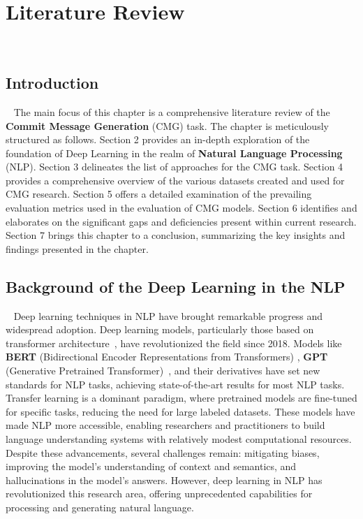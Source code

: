 \chapter{Literature Review}
~\label{chap:lr}




\section{Introduction}~\label{sec:lr_intro}
The main focus of this chapter is a comprehensive literature review of the \textbf{Commit Message Generation} (CMG) task. The chapter is meticulously structured as follows. Section 2 provides an in-depth exploration of the foundation of Deep Learning in the realm of \textbf{Natural Language Processing} (NLP). Section 3 delineates the list of approaches for the CMG task. Section 4 provides a comprehensive overview of the various datasets created and used for CMG research. Section 5 offers a detailed examination of the prevailing evaluation metrics used in the evaluation of CMG models. Section 6 identifies and elaborates on the significant gaps and deficiencies present within current research. Section 7 brings this chapter to a conclusion, summarizing the key insights and findings presented in the chapter.


\section{Background of the Deep Learning in the NLP}~\label{sec:lr_background}
Deep learning techniques in NLP have brought remarkable progress and widespread adoption. Deep learning models, particularly those based on transformer architecture~\cite{vaswani2017attention}, have revolutionized the field since 2018. Models like \textbf{BERT} (Bidirectional Encoder Representations from Transformers){ }\cite{devlin2018bert}, \textbf{GPT} (Generative Pretrained Transformer)~\cite{radford2018improving}, and their derivatives have set new standards for NLP tasks, achieving state-of-the-art results for most NLP tasks. Transfer learning is a dominant paradigm, where pretrained models are fine-tuned for specific tasks, reducing the need for large labeled datasets. These models have made NLP more accessible, enabling researchers and practitioners to build language understanding systems with relatively modest computational resources. Despite these advancements, several challenges remain: mitigating biases,  improving the model's understanding of context and semantics, and hallucinations in the model's answers. However, deep learning in NLP has revolutionized this research area, offering unprecedented capabilities for processing and generating natural language.

